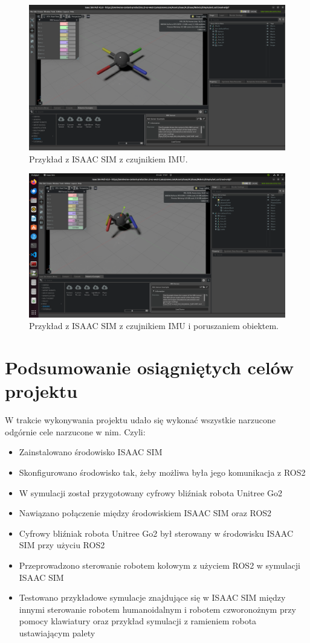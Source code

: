 \documentclass[12pt]{article}
\begin{document}
\begin{figure}[h]
    \centering
    \includegraphics[width=0.7\linewidth]{Zdjęcia/czujnikIMU.png}
    \caption{Przykład z ISAAC SIM z czujnikiem IMU.}
    \label{IMU}
\end{figure}

\begin{figure}
    \centering
    \includegraphics[width=0.7\linewidth]{Zdjęcia/poruszanieIMU.png}
    \caption{Przykład z ISAAC SIM z czujnikiem IMU i poruszaniem obiektem.}
    \label{ruchIMU}
\end{figure}

\clearpage

\section{Podsumowanie osiągniętych celów projektu}

W trakcie wykonywania projektu udało się wykonać wszystkie narzucone odgórnie cele narzucone w nim. Czyli:
\begin{itemize}
    \item Zainstalowano środowisko ISAAC SIM
    \item Skonfigurowano środowisko tak, żeby możliwa była jego komunikacja z ROS2
    \item W symulacji został przygotowany cyfrowy bliźniak robota Unitree Go2
    \item Nawiązano połączenie między środowiskiem ISAAC SIM oraz ROS2
    \item Cyfrowy bliźniak robota Unitree Go2 był sterowany w środowisku ISAAC SIM przy użyciu ROS2
    \item Przeprowadzono sterowanie robotem kołowym z użyciem ROS2 w symulacji ISAAC SIM
    \item Testowano przykładowe symulacje znajdujące się w ISAAC SIM między innymi sterowanie robotem humanoidalnym i robotem czworonożnym przy pomocy klawiatury oraz przykład symulacji z ramieniem robota ustawiającym palety 
    
\end{itemize}
\end{document}
